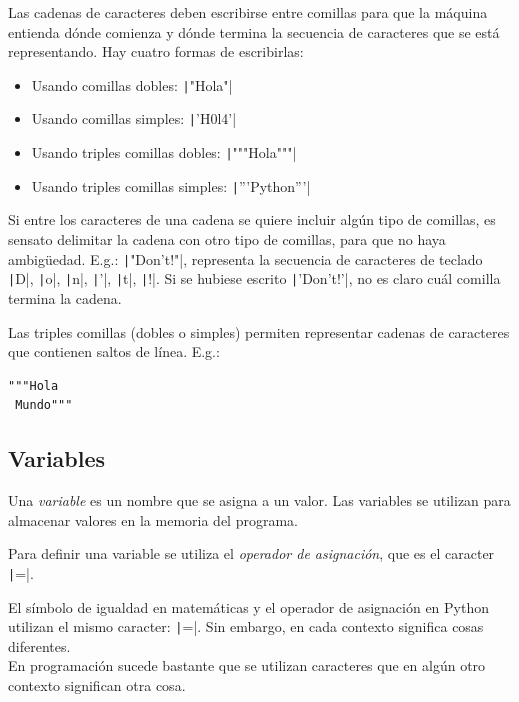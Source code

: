 Las cadenas de caracteres deben escribirse entre comillas para que la máquina entienda dónde comienza y dónde termina la secuencia de caracteres que se está representando. Hay cuatro formas de escribirlas:

\begin{itemize}
  \item Usando comillas dobles: \texttt|"Hola"|
  \item Usando comillas simples: \texttt|'H0l4'|
  \item Usando triples comillas dobles: \texttt|"""Hola"""|
  \item Usando triples comillas simples: \texttt|'''Python'''|
\end{itemize}

Si entre los caracteres de una cadena se quiere incluir algún tipo de comillas, es sensato delimitar la cadena con otro tipo de comillas, para que no haya ambigüedad. E.g.: \texttt|"Don't!"|, representa la secuencia de caracteres de teclado \texttt|D|, \texttt|o|, \texttt|n|, \texttt|'|, \texttt|t|, \texttt|!|. Si se hubiese escrito \texttt|'Don't!'|, no es claro cuál comilla termina la cadena.

Las triples comillas (dobles o simples) permiten representar cadenas de caracteres que contienen saltos de línea. E.g.:
\begin{verbatim}
"""Hola
 Mundo"""
\end{verbatim}

\subsection{Variables}

Una \emph{variable} es un nombre que se asigna a un valor. Las variables se utilizan para almacenar valores en la memoria del programa.

Para definir una variable se utiliza el \emph{operador de asignación}, que es el caracter \texttt|=|. 

\begin{tip}
  El símbolo de igualdad en matemáticas y el operador de asignación en Python utilizan el mismo caracter: \texttt|=|. Sin embargo, en cada contexto significa cosas diferentes.\\
  
  En programación sucede bastante que se utilizan caracteres que en algún otro contexto significan otra cosa.
\end{tip}

